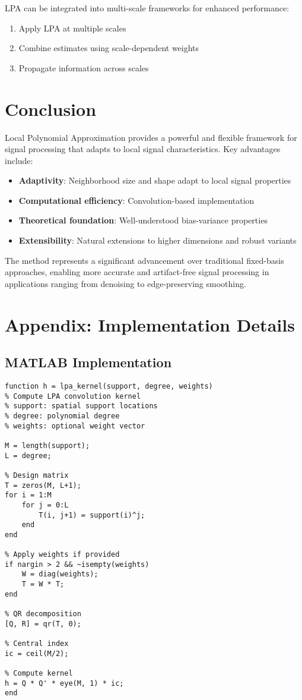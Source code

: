 \documentclass[12pt]{article}
\theoremstyle{definition}
\begin{document}
LPA can be integrated into multi-scale frameworks for enhanced performance:

\begin{enumerate}
    \item Apply LPA at multiple scales
    \item Combine estimates using scale-dependent weights
    \item Propagate information across scales
\end{enumerate}

\section{Conclusion}
\label{sec:conclusion}

Local Polynomial Approximation provides a powerful and flexible framework for signal processing that adapts to local signal characteristics. Key advantages include:

\begin{itemize}
    \item \textbf{Adaptivity}: Neighborhood size and shape adapt to local signal properties
    \item \textbf{Computational efficiency}: Convolution-based implementation
    \item \textbf{Theoretical foundation}: Well-understood bias-variance properties
    \item \textbf{Extensibility}: Natural extensions to higher dimensions and robust variants
\end{itemize}

The method represents a significant advancement over traditional fixed-basis approaches, enabling more accurate and artifact-free signal processing in applications ranging from denoising to edge-preserving smoothing.

\section{Appendix: Implementation Details}
\label{sec:appendix}

\subsection{MATLAB Implementation}
\label{subsec:matlab_impl}

\begin{verbatim}
function h = lpa_kernel(support, degree, weights)
% Compute LPA convolution kernel
% support: spatial support locations
% degree: polynomial degree
% weights: optional weight vector

M = length(support);
L = degree;

% Design matrix
T = zeros(M, L+1);
for i = 1:M
    for j = 0:L
        T(i, j+1) = support(i)^j;
    end
end

% Apply weights if provided
if nargin > 2 && ~isempty(weights)
    W = diag(weights);
    T = W * T;
end

% QR decomposition
[Q, R] = qr(T, 0);

% Central index
ic = ceil(M/2);

% Compute kernel
h = Q * Q' * eye(M, 1) * ic;
end
\end{verbatim}
\end{document}
